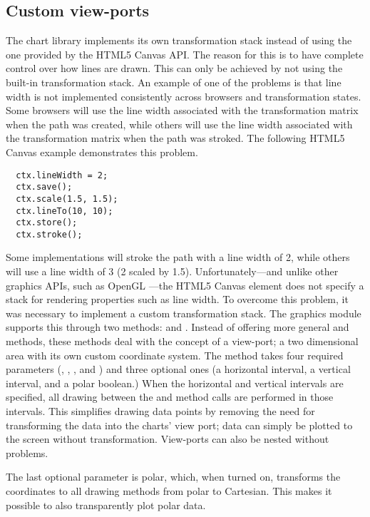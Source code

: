 \subsection{Custom view-ports}
The chart library implements its own transformation stack instead of using the one provided by the HTML5 Canvas API. The reason for this is to have complete control over how lines are drawn. This can only be achieved by not using the built-in transformation stack. An example of one of the problems is that line width is not implemented consistently across browsers and transformation states. Some browsers will use the line width associated with the transformation matrix when the path was created, while others will use the line width associated with the transformation matrix when the path was stroked. The following HTML5 Canvas example demonstrates this problem.
\begin{verbatim}
  ctx.lineWidth = 2;
  ctx.save();
  ctx.scale(1.5, 1.5);
  ctx.lineTo(10, 10);
  ctx.store();
  ctx.stroke();
\end{verbatim}
Some implementations will stroke the path with a line width of 2, while others will use a line width of 3 (2 scaled by 1.5). Unfortunately---and unlike other graphics APIs, such as OpenGL \cite{shreiner05}---the HTML5 Canvas element does not specify a stack for rendering properties such as line width. To overcome this problem, it was necessary to implement a custom transformation stack. The graphics module supports this through two methods:  and . Instead of offering more general  and  methods, these methods deal with the concept of a view-port; a two dimensional area with its own custom coordinate system. The  method takes four required parameters (, , , and ) and three optional ones (a horizontal interval, a vertical interval, and a polar boolean.) When the horizontal and vertical intervals are specified, all drawing between the  and  method calls are performed in those intervals. This simplifies drawing data points by removing the need for transforming the data into the charts' view port; data can simply be plotted to the screen without transformation. View-ports can also be nested without problems.

The last optional parameter is polar, which, when turned on, transforms the coordinates to all drawing methods from polar to Cartesian. This makes it possible to also transparently plot polar data.

